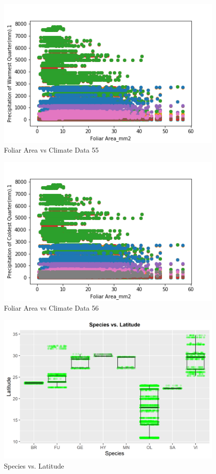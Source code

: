 \documentclass[letterpaper]{article}
\begin{document}
\begin{figure}[h]
\caption{Foliar Area vs Climate Data 55\label{fig:Foliar_Area_vs_55}}
\centering
\includegraphics[width=0.7\paperwidth]{Foliar_Area_vs_55}
\end{figure}


\begin{figure}[h]
\caption{Foliar Area vs Climate Data 56\label{fig:Foliar_Area_vs_56}}
\centering
\includegraphics[width=0.7\paperwidth]{Foliar_Area_vs_56}
\end{figure}

\begin{figure}[h]
\caption{Species vs. Latitude\label{fig:SLat}}
\centering
\includegraphics[width=0.7\paperwidth]{Species_v_Latitude}
\end{figure}
\end{document}
